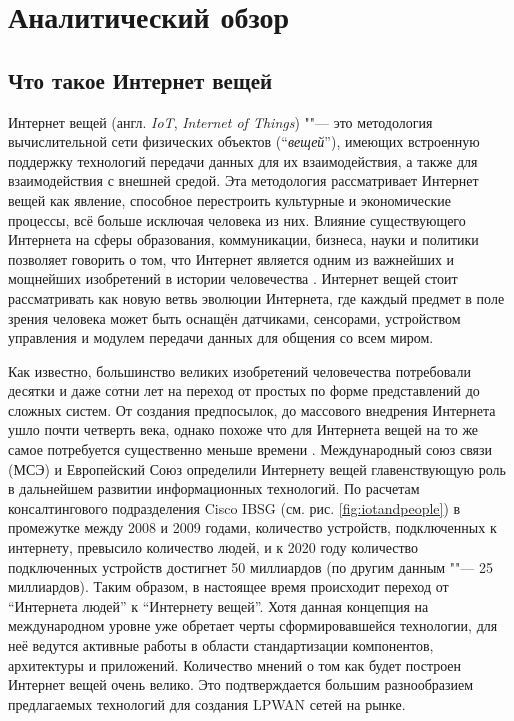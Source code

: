 \chapter{Аналитический обзор}
\label{cha:analysis}
%
%


\section{Что такое Интернет вещей}

Интернет вещей (англ. \textit{IoT}, \textit{Internet of Things}) ""--- это методология вычислительной сети физических объектов (``\textit{вещей}''), имеющих встроенную поддержку технологий передачи данных для их взаимодействия, а также для взаимодействия с внешней средой.
Эта методология рассматривает Интернет вещей как явление, способное перестроить культурные и экономические процессы, всё больше исключая человека из них.
Влияние существующего Интернета на сферы образования, коммуникации, бизнеса, науки и политики позволяет говорить о том, что Интернет является одним из важнейших и мощнейших изобретений в истории человечества \cite{evans2011internet}.
Интернет вещей стоит рассматривать как новую ветвь эволюции Интернета, где каждый предмет в поле зрения человека может быть оснащён датчиками, сенсорами, устройством управления и модулем передачи данных для общения со всем миром.

Как известно, большинство великих изобретений человечества потребовали десятки и даже сотни лет на переход от простых по форме представлений до сложных систем.
От создания предпосылок, до массового внедрения Интернета ушло почти четверть века, однако похоже что для Интернета вещей на то же самое потребуется существенно меньше времени \cite{chernyak2013}.
Международный союз связи (МСЭ) и Европейский Союз определили Интернету вещей 
главенствующую роль в дальнейшем развитии информационных технологий. 
По расчетам консалтингового подразделения Cisco IBSG (см. рис. \ref{fig:iotandpeople}) в промежутке между 2008 и 2009 годами, количество устройств, подключенных к интернету, превысило количество людей, и к 2020 году количество подключенных устройств достигнет 50 миллиардов \cite{evans2011internet} (по другим данным \cite{denise2014} ""--- 25 миллиардов).
Таким образом, в настоящее время происходит переход от ``Интернета людей'' к ``Интернету вещей''.
Хотя данная концепция на международном уровне уже обретает черты сформировавшейся технологии, для неё ведутся активные работы в области стандартизации компонентов, архитектуры и приложений.
Количество мнений о том как будет построен Интернет вещей очень велико. 
Это подтверждается большим разнообразием предлагаемых технологий для создания LPWAN сетей на рынке.

